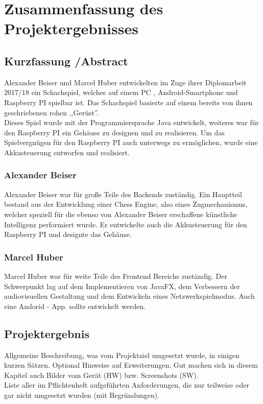 \documentclass[12pt,a4paper]{article}
\newcommand{\yhbu}[0]{\color{ydkbu}}	%
\begin{document}
{%
\newpage
\section{Zusammenfassung des Projektergebnisses}
 \subsection{Kurzfassung /Abstract}
 
	Alexander Beiser und Marcel Huber entwickelten im Zuge ihrer Diplomarbeit 2017/18 ein Schachspiel, welches auf einem \ac{PC} , Android-Smartphone und Raspberry PI spielbar ist. Das Schachspiel basierte auf einem bereits von ihnen geschriebenen rohen ,,Gerüst''. \\
	Dieses Spiel wurde mit der Programmiersprache Java entwickelt, weiteres war für den Raspberry PI ein Gehäuse zu designen und zu realisieren. Um das Spielvergnügen für den Raspberry PI auch unterwegs zu ermöglichen, wurde eine Akkusteuerung entworfen und realisiert. \\
	\subsubsection{Alexander Beiser}
	Alexander Beiser war für große Teile des Backends zuständig. Ein Hauptteil bestand aus der Entwicklung einer Chess Engine, also eines Zugmechanismus, welcher speziell für die ebenso von Alexander Beiser erschaffene künstliche Intelligenz performiert wurde. Er entwickelte auch die Akkusteuerung für den Raspberry PI und designte das Gehäuse.
	
	\subsubsection{Marcel Huber}
	Marcel Huber war für weite Teile des Frontend Bereichs zuständig. Der Schwerpunkt lag auf dem Implementieren von JavaFX, dem Verbessern der audiovisuellen Gestaltung und dem Entwickeln eines Netzwerkspielmodus. Auch eine Andorid - \ac{App.} sollte entwickelt werden.
 
	\vfill
	\newpage	
	
 \subsection{Projektergebnis}
	{\yhbu
	Allgemeine Beschreibung, was vom Projektziel umgesetzt wurde, in einigen kurzen Sätzen.
	Optional Hinweise auf Erweiterungen.
	Gut machen sich in diesem Kapitel auch Bilder vom Gerät (HW) bzw. Screenshots (SW).
	\\[1mm]
	Liste aller im Pflichtenheft aufgeführten Anforderungen,
	die nur teilweise oder gar nicht umgesetzt wurden (mit Begründungen).
	}












}
\end{document}
